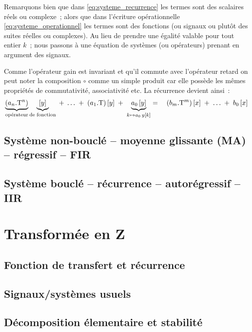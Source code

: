 \begin{remarque}
  Remarquons bien que dans \eqref{eq:systeme_recurrence} les termes
  sont des scalaires réels ou complexe~; alors que dans l'écriture
  opérationnelle \eqref{eq:systeme_operationnel} les termes sont des
  fonctions (ou signaux ou plutôt des suites réelles ou complexes). Au
  lieu de prendre une égalité valable pour tout entier $k$~; nous
  passons à une équation de systèmes (ou opérateurs) prenant en
  argument des signaux.
\end{remarque}


Comme l'opérateur gain est invariant et qu'il commute avec l'opérateur
retard on peut noter la composition $\circ$ comme un simple produit
car elle possède les mêmes propriétés de commutativité, associativité
etc. La récurrence devient ainsi~:
\begin{eqnarray}
 \underbrace{\left(a_n.\mathrm{T}^n\right)}_{\text{opérateur}}\underbrace{\left[y\right]}_{\text{de fonction}}\; +\; \ldots \;+\; \left(a_1.\mathrm{T}\right)\left[y\right] \;+\; \underbrace{a_0\left[y\right]}_{k\mapsto a_0\,y\left[k\right]}  = \quad \left(b_m.\mathrm{T}^m\right)\left[x\right] \;+\; \ldots \;+\; b_0\left[x\right]
\end{eqnarray}







\subsection{Système non-bouclé -- moyenne glissante (MA) -- régressif --
  FIR}
\subsection{Système bouclé -- récurrence -- autorégressif -- IIR}

\section{Transformée en Z}

\subsection{Fonction de transfert et récurrence}
\subsection{Signaux/systèmes usuels}
\subsection{Décomposition élementaire et stabilité}
